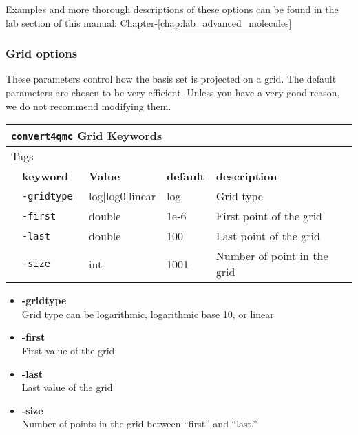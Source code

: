 Examples and more thorough descriptions of these options can be found in the lab section of this manual: Chapter-\ref{chap:lab_advanced_molecules}\\

\subsubsection{Grid options}
                                          
% 
These parameters control how the basis set is projected on a grid. The default parameters are chosen to be very efficient. Unless you have a very good reason, we do not recommend modifying them. 

\begin{table}[h]
 \begin{center}
 \begin{tabularx}{\textwidth}{l l l l l }
 \hline
 \multicolumn{5}{l}{\texttt{convert4qmc} Grid Keywords} \\
 \hline
 \multicolumn{2}{l}{Tags}  & \multicolumn{3}{l}{}\\
    &   \bfseries keyword      & \bfseries Value & \bfseries default   & \bfseries description \\
    &   \texttt{-gridtype    } &  log|log0|linear      &  log & Grid type  \\
    &   \texttt{-first         } & double  &  1e-6 & First point of the grid   \\
    &   \texttt{-last       } & double  & 100 & Last point of the grid \\
    &   \texttt{-size      } &  int    &  1001& Number of point in the grid   \\
     \hline
     \end{tabularx}
 \end{center}
 \end{table}
\begin{itemize}
\item \textbf{-gridtype}\\
Grid type can be logarithmic, logarithmic base 10, or linear \\
\item \textbf{-first}\\
First value of the grid\\
\item \textbf{-last}\\
Last value of the grid\\
\item \textbf{-size}\\
Number of points in the grid between ``first'' and ``last.'' \\
\end{itemize}



